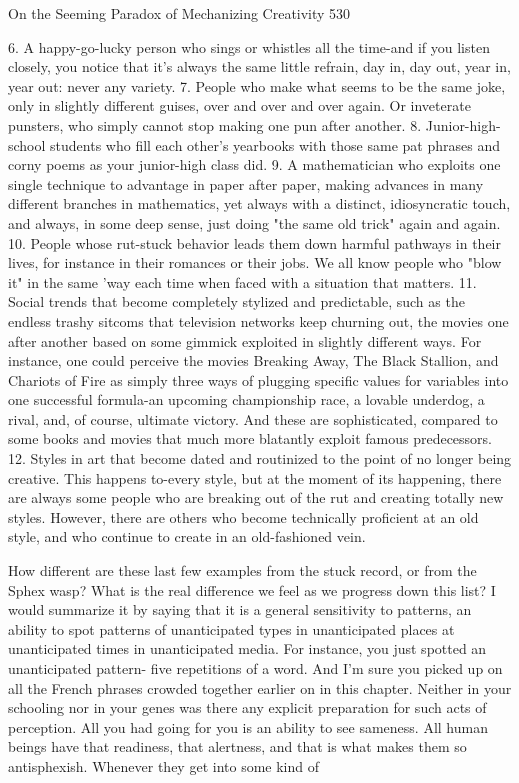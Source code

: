 On the Seeming Paradox of Mechanizing Creativity                                      530

  6. A happy-go-lucky person who sings or whistles all the time-and if you listen
     closely, you notice that it's always the same little refrain, day in, day out,
     year in, year out: never any variety.
  7. People who make what seems to be the same joke, only in slightly different
     guises, over and over and over again. Or inveterate punsters, who simply
     cannot stop making one pun after another.
  8. Junior-high-school students who fill each other's yearbooks with those same
     pat phrases and corny poems as your junior-high class did.
  9. A mathematician who exploits one single technique to advantage in paper
     after paper, making advances in many different branches in mathematics, yet
     always with a distinct, idiosyncratic touch, and always, in some deep sense,
     just doing "the same old trick" again and again.
  10. People whose rut-stuck behavior leads them down harmful pathways in their
     lives, for instance in their romances or their jobs. We all know people who
     "blow it" in the same 'way each time when faced with a situation that
     matters.
  11. Social trends that become completely stylized and predictable, such as the
     endless trashy sitcoms that television networks keep churning out, the
     movies one after another based on some gimmick exploited in slightly
     different ways. For instance, one could perceive the movies Breaking Away,
     The Black Stallion, and Chariots of Fire as simply three ways of plugging
     specific values for variables into one successful formula-an upcoming
     championship race, a lovable underdog, a rival, and, of course, ultimate
     victory. And these are sophisticated, compared to some books and movies
     that much more blatantly exploit famous predecessors.
  12. Styles in art that become dated and routinized to the point of no longer being
     creative. This happens to-every style, but at the moment of its happening,
     there are always some people who are breaking out of the rut and creating
     totally new styles. However, there are others who become technically
     proficient at an old style, and who continue to create in an old-fashioned
     vein.

How different are these last few examples from the stuck record, or from the Sphex
wasp? What is the real difference we feel as we progress down this list?
        I would summarize it by saying that it is a general sensitivity to patterns, an
ability to spot patterns of unanticipated types in unanticipated places at unanticipated
times in unanticipated media. For instance, you just spotted an unanticipated pattern-
five repetitions of a word. And I'm sure you picked up on all the French phrases
crowded together earlier on in this chapter. Neither in your schooling nor in your
genes was there any explicit preparation for such acts of perception. All you had
going for you is an ability to see sameness. All human beings have that readiness, that
alertness, and that is what makes them so antisphexish. Whenever they get into some
kind of




